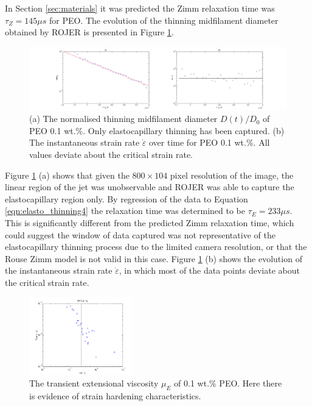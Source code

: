 \documentclass[11pt]{article}
\begin{document}
In Section \ref{sec:materials} it was predicted the Zimm relaxation time was $\tau_Z = 145 \mu s$ for PEO. The evolution of the thinning midfilament diameter obtained by ROJER is presented in Figure \ref{fig:PEO}.
\begin{figure}[H]
	\begin{center}
		\includegraphics[width = 1.15\textwidth, trim = 6cm 0cm 0cm 0cm]{img/PEO.png}
		\caption{(a) The normalised thinning midfilament diameter $D(t)/D_0$ of PEO 0.1 wt.\%. Only elastocapillary thinning has been captured. (b) The instantaneous strain rate $\dot{\varepsilon}$ over time for PEO 0.1 wt.\%. All values deviate about the critical strain rate.}
		\label{fig:PEO}
	\end{center}
\end{figure}

Figure \ref{fig:PEO} (a) shows that given the $800 \times 104$ pixel resolution of the image, the linear region of the jet was unobservable and ROJER was able to capture the elastocapillary region only. By regression of the data to Equation \ref{eqn:elasto_thinning4} the relaxation time was determined to be $\tau_E = 233 \mu s$. This is significantly different from the predicted Zimm relaxation time, which could suggest the window of data captured was not representative of the elastocapillary thinning process due to the limited camera resolution, or that the Rouse Zimm model is not valid in this case. Figure \ref{fig:PEO} (b) shows the evolution of the instantaneous strain rate $\dot{\varepsilon}$, in which most of the data points deviate about the critical strain rate. 
\begin{figure}[h]
	\begin{center}
		\includegraphics[width = 0.4\textwidth]{img/PEO_extensional.png}
		\caption{The transient extensional viscosity $\mu_E$ of 0.1 wt.\% PEO. Here there is evidence of strain hardening characteristics.}
		\label{fig:PEO_extensional}
	\end{center}
\end{figure}
\end{document}
